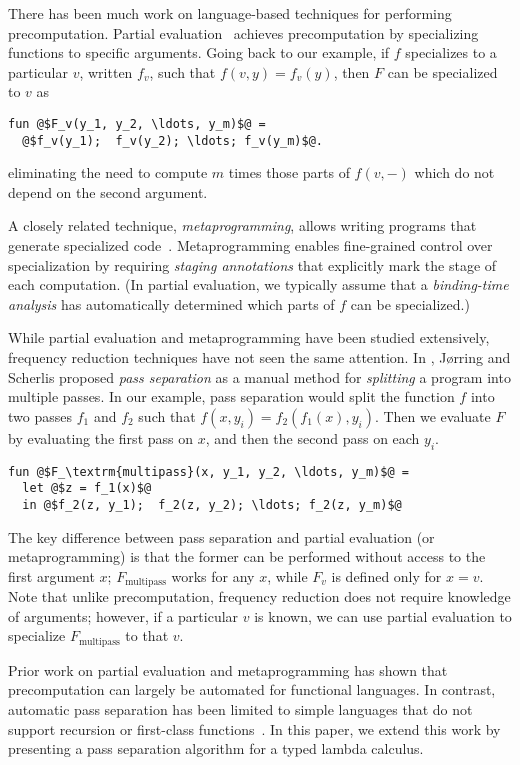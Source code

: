 There has been much work on language-based techniques for performing
precomputation. Partial evaluation~\cite{futamura71,jones96} achieves
precomputation by specializing functions to specific arguments. Going back to
our example, if $f$ specializes to a particular $v$, written $f_v$, such that
$f(v,y) = f_v(y)$, then $F$ can be specialized to $v$ as
\begin{lstlisting}
fun @$F_v(y_1, y_2, \ldots, y_m)$@ = 
  @$f_v(y_1);  f_v(y_2); \ldots; f_v(y_m)$@.
\end{lstlisting}
eliminating the need to compute $m$ times those parts of $f(v,-)$ which do not
depend on the second argument.

A closely related technique, {\em metaprogramming}, allows writing
programs that generate specialized
code~\cite{davies96,Taha97,DP01-modal,NP05-nn}. Metaprogramming
enables fine-grained control over specialization by requiring \emph{staging
annotations} that explicitly mark the stage of each computation. (In
partial evaluation, we typically assume that a \emph{binding-time
  analysis} has automatically determined which parts of $f$ can be
specialized.)

While partial evaluation and metaprogramming have been studied extensively,
frequency reduction techniques have not seen the same attention. In
\cite{JS86-staging}, J{\o}rring and Scherlis proposed {\em pass separation} as a
manual method for {\em splitting} a program into multiple passes.
%
In our example, pass separation would split the function $f$ into two passes
$f_1$ and $f_2$ such that $f(x,y_i) = f_2(f_1(x),y_i)$. Then we evaluate $F$ by
evaluating the first pass on $x$, and then the second pass on each $y_i$.
%
\begin{lstlisting}
fun @$F_\textrm{multipass}(x, y_1, y_2, \ldots, y_m)$@ = 
  let @$z = f_1(x)$@
  in @$f_2(z, y_1);  f_2(z, y_2); \ldots; f_2(z, y_m)$@
\end{lstlisting}
%
The key difference between pass separation and partial evaluation (or
metaprogramming) is that the former can be performed without access to
the first argument $x$; $F_\textrm{multipass}$ works for any $x$,
while $F_v$ is defined only for $x=v$.  Note that unlike
precomputation, frequency reduction does not require knowledge of
arguments; however, if a particular $v$ is known, we can use partial evaluation
to specialize $F_\textrm{multipass}$ to that $v$.

Prior work on partial evaluation and metaprogramming has shown that
precomputation can largely be automated for functional languages. In contrast,
automatic pass separation has been limited to simple languages that do not
support recursion or first-class
functions~\cite{knoblock96,Proudfoot:2001,Foley:2011,He:2014}. In this paper, we
extend this work by presenting a pass separation algorithm for a typed lambda
calculus.

